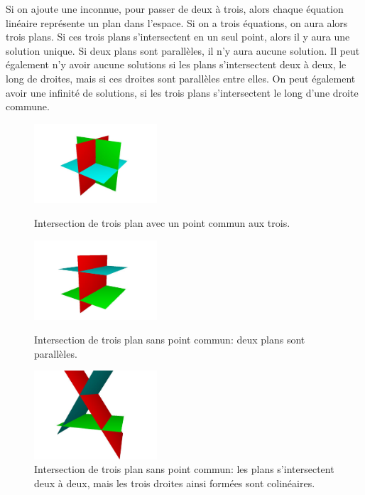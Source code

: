 Si on ajoute une inconnue, pour passer de deux à trois, alors chaque équation linéaire représente
un plan dans l'espace.  Si on a trois équations, on aura alors trois plans.  Si ces trois plans s'intersectent
en un seul point, alors il y aura une solution unique.  Si deux plans sont parallèles, il n'y aura aucune
solution.  Il peut également n'y avoir aucune solutions si les plans s'intersectent deux à deux, le long de droites,
mais si ces droites sont parallèles entre elles.  On peut également avoir une infinité de solutions, si les trois
plans s'intersectent le long d'une droite commune.
\begin{figure}[h]
\begin{minipage}{0.3\textwidth}
\includegraphics[width=1.8in]{images/three-planes-1.jpg}
\caption{Intersection de trois plan avec un point commun aux trois.}
\end{minipage}
\hfill
\begin{minipage}{0.3\textwidth}
\includegraphics[width=1.8in]{images/three-planes-0.jpg}
\caption{Intersection de trois plan sans point commun: deux plans sont parallèles.}
\end{minipage}
\hfill
\begin{minipage}{0.3\textwidth}
\includegraphics[width=1.8in]{images/three-planes-2.jpg}
\caption{Intersection de trois plan sans point commun: les plans s'intersectent deux à deux, mais
les trois droites ainsi formées sont colinéaires.}
\end{minipage}
\end{figure}


